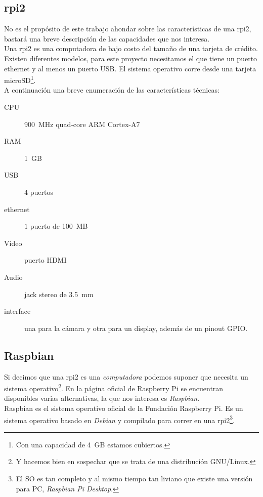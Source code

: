 \documentclass[10pt,a4paper]{article}
\begin{document}
\subsection{rpi2}

No es el prop\'osito de este trabajo ahondar sobre las caracter\'isticas de una rpi2, bastar\'a una breve descripci\'on de las capacidades que nos interesa.\\

Una rpi2 es una computadora de bajo costo del tama\~no de una tarjeta de cr\'edito. Existen diferentes modelos, para este proyecto necesitamos el que tiene un puerto ethernet y al menos un puerto USB. El sistema operativo corre desde una tarjeta microSD\footnote{Con una capacidad de \SI{4}{GB} estamos cubiertos.}.\\

A continuaci\'on una breve enumeraci\'on de las caracter\'isticas t\'ecnicas:
\begin{description}
    \item [CPU] \SI{900}{MHz} quad-core ARM Cortex-A7
    \item [RAM] \SI{1}{GB}
    \item [USB] $4$ puertos
    \item [ethernet] $1$ puerto de \SI{100}{MB}
    \item [Video] puerto HDMI
    \item [Audio] jack stereo de \SI{3,5}{mm}
    \item [interface] una para la c\'amara y otra para un display, adem\'as de un pinout GPIO.
\end{description}

\subsection{Raspbian}

Si decimos que una rpi2 es una \emph{computadora} podemos suponer que necesita un sistema operativo\footnote{Y hacemos bien en sospechar que se trata de una distribuci\'on GNU/Linux.}. En la p\'agina oficial de Raspberry Pi se encuentran disponibles varias alternativas, la que nos interesa es \emph{Raspbian}.\\

Raspbian es el sistema operativo oficial de la Fundaci\'on Raspberry Pi. Es un sistema operativo basado en \emph{Debian} y compilado para correr en una rpi2\footnote{El SO es tan completo y al mismo tiempo tan liviano que existe una versi\'on para PC, \emph{Raspbian Pi Desktop}.}.\\
\end{document}
